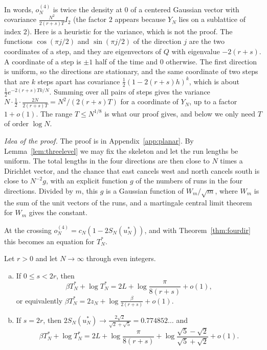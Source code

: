 In words, $o^{(4)}_N$ is twice the density at $0$ of a centered Gaussian vector with covariance
$\frac{N^2}{2(r+s)T}I_2$ (the factor $2$ appears because $Y_N$ lies on a sublattice of index $2$).
Here is a heuristic for the variance, which is not the proof. The functions $\cos(\pi j/2)$ and $\sin(\pi j/2)$ of the
direction $j$ are the two coordinates of a step, and they are eigenvectors of $Q$ with eigenvalue
$-2(r+s)$. A coordinate of a step is $\pm1$ half of the time and $0$ otherwise. The first direction is uniform, so the directions are stationary, and the same coordinate of two steps that are $k$ steps apart has covariance
$\frac12(1-2(r+s)h)^k$, which is about $\frac12e^{-2(r+s)Tk/N}$. Summing over all pairs of steps
gives the variance $N\cdot\frac12\cdot\frac{2N}{2(r+s)T}=N^2/(2(r+s)T)$ for a coordinate of $Y_N$,
up to a factor $1+o(1)$. The range $T\le N^{1/8}$ is what our proof gives, and
below we only need $T$ of order $\log N$.

\emph{Idea of the proof.} The proof is in Appendix~\ref{app:planar}. By
Lemma~\ref{lem:threelevel} we may fix the skeleton and let the run lengths be uniform. The total
lengths in the four directions are then close to $N$ times a Dirichlet vector, and the chance that
east cancels west and north cancels south is close to $N^{-2}g$, with an explicit function $g$ of
the numbers of runs in the four directions. Divided by $m$, this $g$ is a Gaussian function of
$W_m/\sqrt m$, where $W_m$ is the sum of the unit vectors of the runs, and a martingale central limit
theorem for $W_m$ gives the constant.

At the crossing $o^{(4)}_N=c_N(1-2S_N(u^*_N))$, and with Theorem~\ref{thm:fourdir} this becomes
an equation for $T^*_N$.

\begin{corollary}\label{cor:planar-turn}
Let $r>0$ and let $N\to\infty$ through even integers.
\begin{enumerate}[(a)]
\item If $0\le s<2r$, then
\[
 \beta T^*_N+\log T^*_N=2L+\log\frac\pi{8(r+s)}+o(1),
\]
or equivalently $\beta T^*_N=2z_N+\log\frac\beta{2(r+s)}+o(1)$.
\item If $s=2r$, then $2S_N(u^*_N)\to\frac{2\sqrt2}{\sqrt2+\sqrt5}=0.774852\ldots$ and
\[
 \beta T^*_N+\log T^*_N=2L+\log\frac\pi{8(r+s)}
 +\log\frac{\sqrt5-\sqrt2}{\sqrt5+\sqrt2}+o(1).
\]
\end{enumerate}
\end{corollary}

